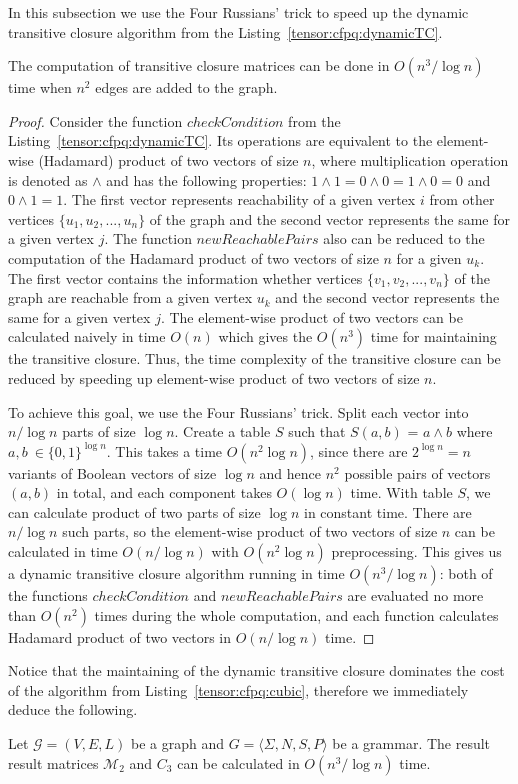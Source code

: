 In this subsection we use the Four Russians' trick to speed up the dynamic transitive closure algorithm from the Listing~\ref{tensor:cfpq:dynamicTC}.
\begin{theorem}{}
    The computation of transitive closure matrices can be done in $O(n^3/\log n)$ time when $n^2$ edges are added to the graph.
\end{theorem}
\begin{proof}
Consider the function $checkCondition$ from the Listing~\ref{tensor:cfpq:dynamicTC}. Its operations are equivalent to the element-wise (Hadamard) product of two vectors of size $n$, where multiplication operation is denoted as $\wedge$ and has the following properties: $1 \wedge 1 = 0 \wedge 0 = 1 \wedge 0 = 0$ and $0 \wedge 1 = 1$. The first vector represents reachability of a given vertex $i$ from other vertices $\{u_1, u_2, ..., u_n\}$ of the graph and the second vector represents the same for a given vertex $j$. The function $newReachablePairs$ also can be reduced to the computation of the Hadamard product of two vectors of size $n$ for a given $u_k$. The first vector contains the information whether vertices  $\{v_1, v_2, ..., v_n\}$ of the graph are reachable from a given vertex $u_k$ and the second vector represents the same for a given vertex $j$. The element-wise product of two vectors can be calculated naively in time $O(n)$ which gives the $O(n^3)$ time for maintaining the transitive closure. Thus, the time complexity of the transitive closure can be reduced by speeding up element-wise product of two vectors of size $n$. 


To achieve this goal, we use the Four Russians' trick. Split each vector into $n/\log n$ parts of size $\log n$. Create a table $S$ such that $S(a, b)$ = $a \wedge b$ where $a, b \ \in {\{0,1\}}^{\log n}$. This takes a time $O(n^2 \log n)$, since there are $2^{\log n} = n$ variants of Boolean vectors of size $\log n$ and hence $n^2$ possible pairs of vectors $(a, b)$ in total, and each component takes $O(\log n)$ time. With table $S$, we can calculate product of two parts of size $\log n$ in constant time. There are $n/\log n$ such parts, so the element-wise product of two vectors of size $n$ can be calculated in time $O(n/\log n)$ with $O(n^2 \log n)$ preprocessing. This gives us a dynamic transitive closure algorithm running in time $O(n^3/\log n)$: both of the functions $checkCondition$ and  $newReachablePairs$ are evaluated no more than $O(n^2)$ times during the whole computation, and each function calculates Hadamard product of two vectors in $O(n/\log n)$ time.
\end{proof} 
Notice that the maintaining of the dynamic transitive closure dominates the cost of the algorithm from Listing~\ref{tensor:cfpq:cubic}, therefore we immediately deduce the following.
\begin{corollary}{}
    Let $\mathcal{G} = (V,E,L)$ be a graph and $G = \langle\Sigma, N, S, P\rangle$ be a grammar.
    The result result matrices $\mathcal{M}_2$ and $C_3$ can be calculated in $O(n^3/\log n)$ time.
\end{corollary}


